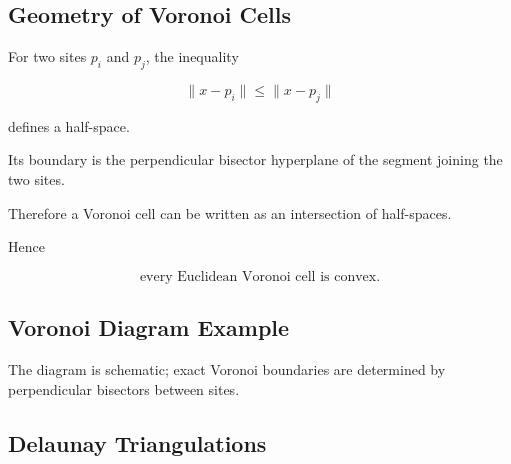 \subsection{Geometry of Voronoi Cells}
\label{subsec:voronoi-cell-geometry}

For two sites \(p_i\) and \(p_j\), the inequality

\[
\|x-p_i\|
\leq
\|x-p_j\|
\]

defines a half-space.

Its boundary is the perpendicular bisector hyperplane of the segment joining
the two sites.

Therefore a Voronoi cell can be written as an intersection of half-spaces.

Hence

\[
\boxed{
\text{every Euclidean Voronoi cell is convex}.
}
\]

\subsection{Voronoi Diagram Example}
\label{subsec:voronoi-example}

\begin{centereddiagram}
\end{centereddiagram}

The diagram is schematic; exact Voronoi boundaries are determined by
perpendicular bisectors between sites.

\subsection{Delaunay Triangulations}
\label{subsec:delaunay-triangulations}

